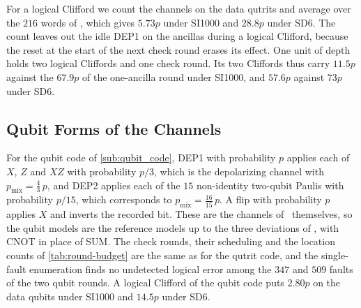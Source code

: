 For a logical Clifford we count the channels on the data qutrits and average over the $216$ words of , which gives $5.73p$ under SI1000 and $28.8p$ under SD6. The count leaves out the idle DEP1 on the ancillas during a logical Clifford, because the reset at the start of the next check round erases its effect. One unit of depth holds two logical Cliffords and one check round. Its two Cliffords thus carry $11.5p$ against the $67.9p$ of the one-ancilla round under SI1000, and $57.6p$ against $73p$ under SD6.

\subsection{Qubit Forms of the Channels}
\label{app:rounds-qubit}

For the qubit code of \autoref{sub:qubit_code}, DEP1 with probability $p$ applies each of $X$, $Z$ and $XZ$ with probability $p/3$, which is the depolarizing channel with $p_{\mathrm{mix}} = \tfrac{4}{3}\,p$, and DEP2 applies each of the $15$ non-identity two-qubit Paulis with probability $p/15$, which corresponds to $p_{\mathrm{mix}} = \tfrac{16}{15}\,p$. A flip with probability $p$ applies $X$ and inverts the recorded bit. These are the channels of~\cite{GidneyHoneycomb2021} themselves, so the qubit models are the reference models up to the three deviations of , with CNOT in place of SUM. The check rounds, their scheduling and the location counts of \autoref{tab:round-budget} are the same as for the qutrit code, and the single-fault enumeration finds no undetected logical error among the $347$ and $509$ faults of the two qubit rounds. A logical Clifford of the qubit code puts $2.80p$ on the data qubits under SI1000 and $14.5p$ under SD6.
